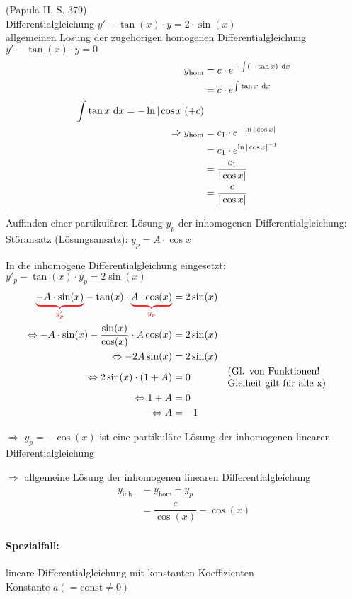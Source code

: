 \Bsp (Papula II, S. 379)\\
Differentialgleichung $y'-\tan(x)\cdot y=2\cdot\sin(x)$\\
allgemeinen Lösung der zugehörigen homogenen Differentialgleichung $y'-\tan(x)\cdot y=0$
\begin{align*}
y_\text{hom}&=c\cdot e^{-\int(-\tan x)\ \mathrm{d}x}\\
&=c\cdot e^{\int\tan x\ \mathrm{d}x}\\
\int\tan x\ \mathrm{d}x=-\ln|\cos x|(+c)\\
\Rightarrow y_\text{hom}&=c_1\cdot e^{-\ln|\cos x|}\\
&=c_1\cdot e^{\ln|\cos x|^{-1}}\\
&=\dfrac{c_1}{|\cos x|}\\
&=\dfrac{c}{|\cos x|}
\end{align*}

Auffinden einer partikulären Lösung $y_p$ der inhomogenen Differentialgleichung:\\
Störansatz (Lösungsansatz): $y_p=A\cdot\cos x$

In die inhomogene Differentialgleichung eingesetzt: $y'_p-\tan(x)\cdot y_p=2\sin(x)$
\begin{align*}
\redunderbrace{-A\cdot\sin(x)}{y'_p}-\tan(x)\cdot\redunderbrace{A\cdot\cos(x)}{y_p}&=2\sin(x)\\
\Leftrightarrow -A\cdot\sin(x)-\dfrac{\sin(x)}{\cos(x)}\cdot A\cos(x)&=2\sin(x)\\
\Leftrightarrow-2A\sin(x)&=2\sin(x)\\
\Leftrightarrow2\sin(x)\cdot(1+A)&=0&\parbox{4cm}{(Gl. von Funktionen!\\Gleiheit gilt für alle x)}\\
\Leftrightarrow 1+A&=0\\
\Leftrightarrow A&=-1
\end{align*}

$\Rightarrow$ $y_p=-\cos(x)$ ist eine partikuläre Lösung der inhomogenen linearen Differentialgleichung

$\Rightarrow$ allgemeine Lösung der inhomogenen linearen Differentialgleichung
\begin{align*}
y_\text{inh}&=y_\text{hom}+y_p\\
&=\dfrac{c}{\cos(x)}-\cos(x)
\end{align*}

\paragraph{Spezialfall:} lineare Differentialgleichung mit konstanten Koeffizienten\\
\hhspace{2cm}\qquad Konstante $a(=\text{const}\ne0)$

